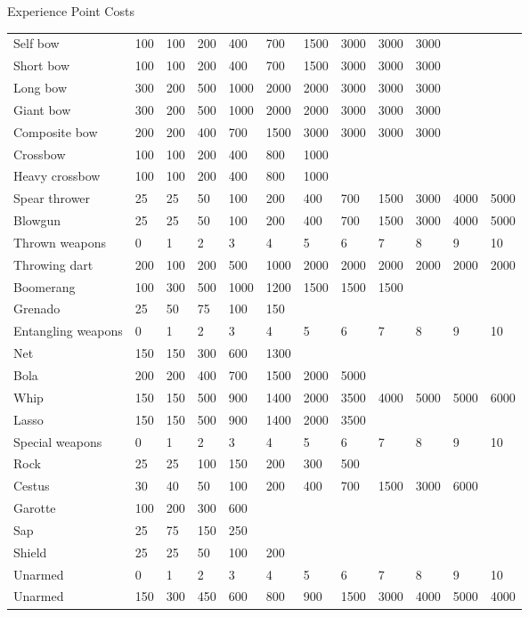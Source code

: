 \begin{Tables}{Experience Point Costs}
\begin{tabularx}{\linewidth}{Xlllllllllll}
Self bow		& 100	& 100 	& 200	& 400	& 700	& 1500	& 3000	& 3000	& 3000	& 	&  \\
Short bow		& 100	& 100 	& 200	& 400	& 700	& 1500	& 3000	& 3000	& 3000	& 	&  \\
Long bow		& 300	& 200 	& 500	& 1000	& 2000	& 2000	& 3000	& 3000	& 3000	& 	&  \\
Giant bow		& 300	& 200 	& 500	& 1000	& 2000	& 2000	& 3000	& 3000	& 3000	& 	&  \\
Composite bow		& 200	& 200 	& 400	& 700	& 1500	& 3000	& 3000	& 3000	& 3000	& 	&  \\
Crossbow		& 100	& 100 	& 200	& 400	& 800	& 1000	& 	& 	& 	& 	&  \\
Heavy crossbow		& 100	& 100 	& 200	& 400	& 800	& 1000	& 	& 	& 	& 	&  \\
Spear thrower		& 25	& 25 	& 50	& 100	& 200	& 400	& 700	& 1500	& 3000	& 4000	& 5000 \\
Blowgun			& 25	& 25 	& 50	& 100	& 200	& 400	& 700	& 1500	& 3000	& 4000	& 5000 \\ \hline
Thrown weapons		& 0	& 1 	& 2	& 3	& 4	& 5	& 6	& 7	& 8	& 9	& 10 \\
Throwing dart		& 200	& 100 	& 200	& 500	& 1000	& 2000	& 2000	& 2000	& 2000	& 2000	& 2000 \\
Boomerang		& 100	& 300 	& 500	& 1000	& 1200	& 1500	& 1500	& 1500	& 	& 	&  \\
Grenado			& 25	& 50 	& 75	& 100	& 150	& 	& 	& 	& 	& 	&  \\ \hline
Entangling weapons	& 0	& 1	& 2	& 3	& 4	& 5 	& 6	& 7	& 8	& 9	& 10 \\ \hline
Net			& 150	& 150 	& 300	& 600	& 1300	& 	& 	& 	& 	& 	&  \\
Bola			& 200	& 200	& 400	& 700	& 1500	& 2000	& 5000	& 	& 	& 	&  \\
Whip			& 150	& 150 	& 500	& 900	& 1400	& 2000	& 3500	& 4000	& 5000	& 5000	& 6000 \\
Lasso			& 150	& 150	& 500	& 900	& 1400	& 2000	& 3500	& 	& 	& 	&  \\
Special weapons		& 0	& 1 	& 2	& 3	& 4	& 5	& 6	& 7	& 8	& 9	& 10 \\
Rock			& 25	& 25 	& 100	& 150	& 200	& 300	& 500	& 	& 	& 	&  \\
Cestus			& 30	& 40	& 50	& 100	& 200	& 400	& 700	& 1500	& 3000	& 6000	&  \\
Garotte			& 100	& 200	& 300	& 600	& 	& 	& 	& 	& 	& 	&  \\
Sap			& 25	& 75	& 150	& 250	& 	& 	& 	& 	& 	& 	&  \\
Shield			& 25	& 25	& 50	& 100	& 200	& 	& 	& 	& 	& 	&  \\ \hline
Unarmed			& 0	& 1 	& 2	& 3	& 4	& 5	& 6	& 7	& 8	& 9	& 10 \\ \hline
Unarmed			& 150	& 300 	& 450	& 600	& 800	& 900	& 1500	& 3000	& 4000	& 5000	& 4000 \\
\end{tabularx}
\endgroup



\end{Tables}
